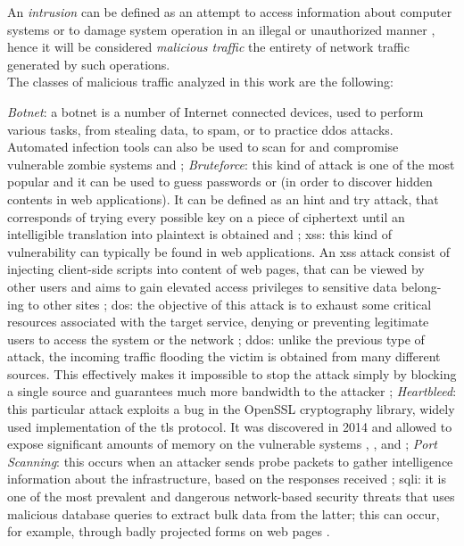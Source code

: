 An \textit{intrusion} can be defined as an attempt to access information about computer systems or to damage system operation in an illegal or unauthorized manner \cite{Liu2019}, hence it will be considered \textit{malicious traffic} the entirety of network traffic generated by such operations. \\
The classes of malicious traffic analyzed in this work are the following:

\begin{itemize}
    \itemAR \textit{Botnet}: a botnet is a number of Internet connected devices, used to perform various tasks, from stealing data, to spam, or to practice \gls{ddos} attacks. Automated infection tools can also be used to scan for and compromise vulnerable zombie systems \cite[p.~250]{Sharafaldin2019} and \cite{icissp18};
    \itemAR \textit{Bruteforce}: this kind of attack is one of the most popular and it can be used to guess passwords or  (in order to discover hidden contents in web applications). It can be defined as an hint and try attack, that corresponds of trying every possible key on a piece of ciphertext until an intelligible translation into plaintext is obtained \cite[p.~43]{Sharafaldin2019} and \cite{icissp18};
    \itemAR \gls{xss}: this kind of vulnerability can typically be found in web applications. An \gls{xss} attack consist of injecting client-side scripts into  content of web pages, that can be viewed by other users and aims to gain elevated access privileges to sensitive data belong- ing to other sites \cite[p.~387]{Sharafaldin2019};
    \itemAR \gls{dos}: the objective of this attack is to exhaust some critical resources associated with the target service, denying or preventing legitimate users to access the system or the network \cite[p.~241]{Sharafaldin2019};
    \itemAR \gls{ddos}: unlike the previous type of attack, the incoming traffic flooding the victim is obtained from many different sources. This effectively makes it impossible to stop the attack simply by blocking a single source and guarantees much more bandwidth to the attacker \cite[p.~241]{Sharafaldin2019};
    \itemAR \textit{Heartbleed}: this particular attack exploits a bug in the OpenSSL cryptography library, widely used implementation of the \gls{tls} protocol. It was discovered in 2014 and allowed to expose significant amounts of memory on the vulnerable systems \cite{Carvalho2014}, \cite[p.~706]{Sharafaldin2019}, \cite{icissp18} and \cite{Stallings2014};
    \itemAR \textit{Port Scanning}: this occurs when an attacker sends probe packets to gather intelligence information about the infrastructure, based on the responses received \cite{icissp18};
    \itemAR \gls{sqli}: it is one of the most prevalent and dangerous network-based security threats that uses malicious database queries to extract bulk data from the latter; this can occur, for example, through badly projected forms on web pages \cite[p.~163]{Sharafaldin2019}.
\end{itemize}
